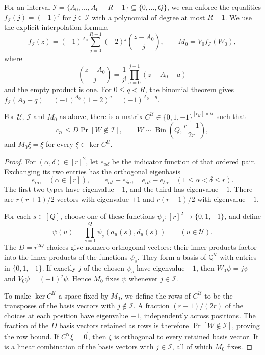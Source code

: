 For an interval
$\mathcal I=\{A_0,\ldots,A_0+R-1\}\subseteq\{0,\ldots,Q\}$,
we can enforce the equalities $f_{\mathcal I}(j)=(-1)^j$
for $j\in\mathcal I$ with a polynomial of degree at most $R-1$.
We use the explicit interpolation formula
\begin{equation}\label{eq:swap-matrix-definition}
 f_{\mathcal I}(z)=(-1)^{A_0}\sum_{j=0}^{R-1}(-2)^j
                         \binom{z-A_0}{j},
 \qquad M_0=V_0f_{\mathcal I}(W_0),
\end{equation}
where
\[
 \binom{z-A_0}{j}=\frac1{j!}\prod_{a=0}^{j-1}(z-A_0-a)
\]
and the empty product is one. For $0\le q<R$, the binomial theorem gives
$f_{\mathcal I}(A_0+q)=(-1)^{A_0}(1-2)^q=(-1)^{A_0+q}$.

\begin{lemma}\label{lem:swaps-matrix}
For $\mathcal U$, $\mathcal I$ and $M_0$ as above, there is a matrix
$C^{\mathcal U}\in\{0,1,-1\}^{[c_{\mathcal U}]\times\mathcal U}$ such that
\[
 c_{\mathcal U}\le D\Pr[W\notin\mathcal I],\qquad
 W\sim\operatorname{Bin}\!\left(Q,\frac{r-1}{2r}\right),
\]
and $M_0\xi=\xi$ for every $\xi\in\ker C^{\mathcal U}$.
\end{lemma}
\begin{proof}
For $(\alpha,\delta)\in[r]^2$, let $e_{\alpha\delta}$ be the
indicator function of that ordered pair. Exchanging its two entries
has the orthogonal eigenbasis
\[
 e_{\alpha\alpha}\quad(\alpha\in[r]),\qquad
 e_{\alpha\delta}+e_{\delta\alpha},\quad
 e_{\alpha\delta}-e_{\delta\alpha}\quad(1\le\alpha<\delta\le r).
\]
The first two types have eigenvalue $+1$, and the third has eigenvalue
$-1$. There are $r(r+1)/2$ vectors with eigenvalue $+1$ and
$r(r-1)/2$ with eigenvalue $-1$.

For each $s\in[Q]$, choose one of these functions
$\psi_s:[r]^2\to\{0,1,-1\}$, and define
\[
 \psi(u)=\prod_{s=1}^Q\psi_s(a_u(s),d_u(s))
 \qquad(u\in\mathcal U).
\]
The $D=r^{2Q}$ choices give nonzero orthogonal vectors: their inner
products factor into the inner products of the functions $\psi_s$.
They form a basis of $\mathbb Q^{\mathcal U}$ with entries in
$\{0,1,-1\}$. If exactly $j$ of the chosen $\psi_s$ have eigenvalue
$-1$, then $W_0\psi=j\psi$ and $V_0\psi=(-1)^j\psi$. Hence $M_0$
fixes $\psi$ whenever $j\in\mathcal I$.

To make $\ker C^{\mathcal U}$ a space fixed by $M_0$, we define
the rows of $C^{\mathcal U}$ to be the transposes of the basis
vectors with $j\notin\mathcal I$.
A fraction $(r-1)/(2r)$ of the choices at each
position have eigenvalue $-1$, independently across positions. The
fraction of the $D$ basis vectors retained as rows is therefore
$\Pr[W\notin\mathcal I]$, proving the row bound. If
$C^{\mathcal U}\xi=\vec{0}$, then $\xi$ is orthogonal to every retained
basis vector. It is a linear combination of the basis vectors with
$j\in\mathcal I$, all of which $M_0$ fixes.
\end{proof}

